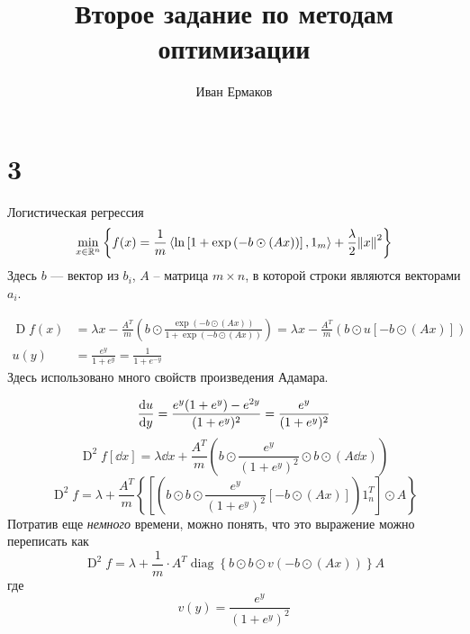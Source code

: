 \documentclass[notitlepage]{article}
\title{Второе задание по методам оптимизации}
\author{Иван Ермаков}
\date{}
\newcommand\inner[2]{\left\langle #1, #2 \right\rangle}
\begin{document}
\maketitle
\section*{3}
Логистическая регрессия
\begin{equation}
  \min_{x \in \mathbb{R}^n} \left\{f(x) = \frac 1m\inner{\ln\left[1 + \exp\left(-b \odot \left(A x\right)\right)\right]}{1_m}
  + \frac{\lambda}2 \norm{x}^2\right\}
\end{equation}
Здесь $b$ --- вектор из $b_i$, $A$ -- матрица $m \times n$, в которой строки являются векторами $a_i$.

\begin{equation}
  \begin{aligned}
    \operatorname{D} f(x) &= \lambda x - \frac {A^T} m\left(b\odot\frac{\exp\left(-b \odot \left(A x\right)\right)}
  {1 + \exp\left(-b \odot \left(A x\right)\right)}\right) = 
  \lambda x - \frac {A^T} m\left(b\odot u\left[-b\odot \left(A x\right)\right]\right)\\
  u(y) &= \frac{e^y}{1 + e^y} = \frac1{1 + e^{-y}}
  \end{aligned}
\end{equation}
Здесь использовано много свойств произведения Адамара.

\begin{equation}
    \dv{u}{y} = \frac{e^y(1 + e^y) - e^{2y}}{(1 + e^y)^2} = \frac{e^y}{(1 + e^y)^2}\\
    \end{equation}
\begin{equation}
  \operatorname{D}^2 f[\dd x] = \lambda \dd x + \frac {A^T}m \left(b\odot \frac{e^y}{(1 + e^y)^2} \odot b \odot \left(A \dd x \right)\right)
    \end{equation}
\begin{equation}
  \operatorname{D}^2 f = 
  \lambda + \frac {A^T}m \left\{\left[\left(b \odot b \odot \frac{e^y}{(1 + e^y)^2}[-b \odot (Ax)]\right) 1_n^T\right] \odot A\right\}
\end{equation}
Потратив еще \textit{немного} времени, можно понять, что это выражение можно переписать как
\begin{equation}
  \operatorname{D}^2 f = \lambda + \frac 1m \cdot A^T \operatorname{diag}\left\{b\odot b \odot v(-b \odot \left(A x\right))\right\} A
\end{equation}
где
\begin{equation}
  v(y) = \frac{e^y}{(1 + e^y)^2}
\end{equation}
\end{document}
